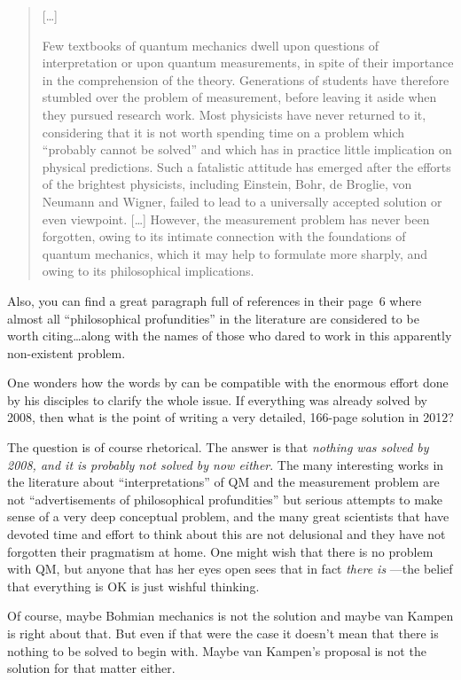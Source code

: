 \documentclass[12pt]{article}
\begin{document}
\begin{itemize}
\begin{quote}
{[\ldots]

Few textbooks of quantum mechanics dwell upon questions of
interpretation or upon quantum measurements, in spite of their importance in
the comprehension of the theory. Generations of students have therefore
stumbled over the problem of measurement, before leaving it aside when they
pursued research work. Most physicists have never returned to it, considering
that it is not worth spending time on a problem which ``probably cannot be
solved'' and which has in practice little implication on physical predictions.
Such a fatalistic attitude has emerged after the efforts of the brightest
physicists, including Einstein, Bohr, de Broglie, von Neumann and Wigner,
failed to lead to a universally accepted solution or even viewpoint. [\ldots]
However, the measurement problem has never been forgotten, owing to its
intimate connection with the foundations of quantum mechanics, which it may
help to formulate more sharply, and owing to its philosophical implications.}
\end{quote}

Also, you can find a great paragraph full of references in their page~6 where
almost all ``philosophical profundities'' in the literature are considered to
be worth citing\ldots along with the names of those who dared to work in
this apparently non-existent problem.

\end{itemize}

One wonders how the words by \cite{VanKampen2008} can be compatible with the
enormous effort done by his disciples to clarify the whole issue. If
everything was already solved by 2008, then what is the point of writing a
very detailed, 166-page solution in 2012?

The question is of course rhetorical. The answer is that \emph{nothing was
solved by 2008, and it is probably not solved by now either}. The many
interesting works in the literature about ``interpretations'' of QM and the
measurement problem are not ``advertisements of philosophical profundities''
but serious attempts to make sense of a very deep conceptual problem, and the
many great scientists that have devoted time and effort to think about this
are not delusional and they have not forgotten their pragmatism at home. One
might wish that there is no problem with QM, but anyone that has her eyes open
sees that in fact \emph{there is} ---the belief that everything is OK is just
wishful thinking.

Of course, maybe Bohmian mechanics is not the solution and maybe van Kampen is
right about that. But even if that were the case it doesn't mean that there is
nothing to be solved to begin with. Maybe van Kampen's proposal is not the
solution for that matter either.
\end{document}
